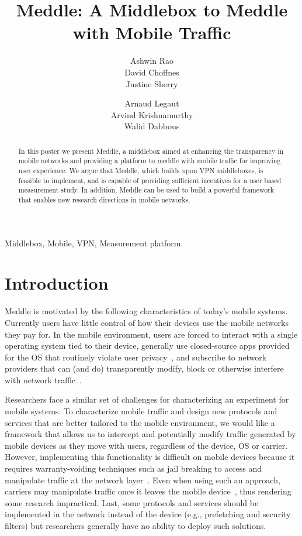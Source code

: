 \documentclass{sig-alternate-10pt}
\title{Meddle: A Middlebox to Meddle with Mobile Traffic}
\author{
\alignauthor
Ashwin Rao\\
\affaddr{INRIA}
\alignauthor        
David Choffnes\\
\affaddr{University of Washington}
\alignauthor
Justine Sherry\\
\affaddr{UC Berkeley}
\and
\alignauthor
Arnaud Legaut\\
\affaddr{INRIA}
\alignauthor 
Arvind Krishnamurthy\\
\affaddr{University of Washington}
\alignauthor
Walid Dabbous\\
\affaddr{INRIA}
}
\date{}
\newcommand{\meddle}{{Meddle}\xspace}
\begin{document}
	
\maketitle

\begin{abstract}
In this poster we present \meddle, a middlebox aimed at enhancing
the transparency in mobile networks and providing a platform to
meddle with mobile traffic for improving user experience. We argue
that \meddle, which builds upon VPN middleboxes, is feasible to
implement, and is capable of providing sufficient incentives for a
user based measurement study. In addition, \meddle can be used to
build a powerful framework that enables new research directions in
mobile networks.
\end{abstract}

\begin{keywords}
Middlebox, Mobile, VPN, Measurement platform.
\end{keywords}

\section{Introduction}

\meddle is motivated by the following characteristics of today's
mobile systems. Currently users have little control of how their
devices use the mobile networks they pay for. In the mobile
environment, users are forced to interact with a single operating
system tied to their device, generally use closed-source apps provided
for the OS that routinely violate user
privacy~\cite{hornyack:appfence}, and subscribe to network providers
that can (and do) transparently modify, block or otherwise interfere
with network traffic~\cite{wang:middleboxes}.

Researchers face a similar set of challenges for characterizing an
experiment for mobile systems. To characterize mobile traffic and
design new protocols and services that are better tailored to the
mobile environment, we would like a framework that allows us to
intercept and potentially modify traffic generated by mobile devices
as they move with users, regardless of the device, OS or
carrier. However, implementing this functionality is difficult on
mobile devices because it requires warranty-voiding techniques such as
jail breaking to access and manipulate traffic at the network
layer~\cite{enck:taintdroid}. Even when using such an approach,
carriers may manipulate traffic once it leaves the mobile
device~\cite{wang:middleboxes}, thus rendering some research
impractical. Last, some protocols and services should be implemented
in the network instead of the device (e.g., prefetching and security
filters) but researchers generally have no ability to deploy such
solutions.
\end{document}
